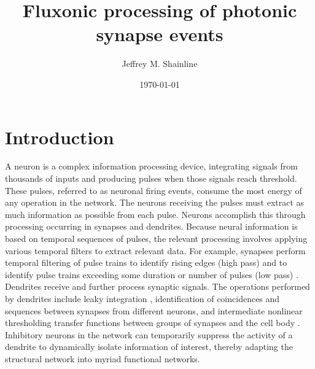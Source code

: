 \documentclass[twocolumn]{article}
\title{Fluxonic processing of photonic synapse events}
\author[1]{Jeffrey M. Shainline}
\affil[1]{National Institute of Standards and Technology, Boulder, CO, 80305}
\date{\today}
\begin{document}


\section{\label{sec:introduction}Introduction}
A neuron is a complex information processing device, integrating signals from thousands of inputs and producing pulses when those signals reach threshold. These pulses, referred to as neuronal firing events, consume the most energy of any operation in the network. The neurons receiving the pulses must extract as much information as possible from each pulse. Neurons accomplish this through processing occurring in synapses and dendrites. Because neural information is based on temporal sequences of pulses, the relevant processing involves applying various temporal filters to extract relevant data. For example, synapses perform temporal filtering of pulse trains to identify rising edges (high pass) and to identify pulse trains exceeding some duration or number of pulses (low pass) \cite{}. Dendrites receive and further process synaptic signals. The operations performed by dendrites include leaky integration \cite{}, identification of coincidences \cite{} and sequences \cite{haah2015} between synapses from different neurons, and intermediate nonlinear thresholding transfer functions between groups of synapses and the cell body \cite{}. Inhibitory neurons in the network can temporarily suppress the activity of a dendrite to dynamically isolate information of interest, thereby adapting the structural network into myriad functional networks.
\end{document}
